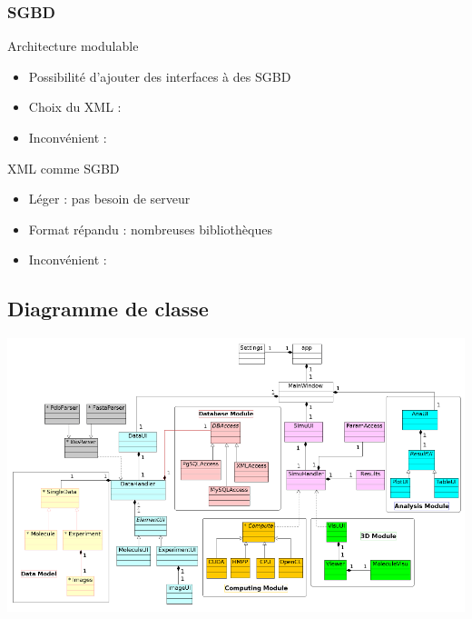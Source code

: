 \documentclass{beamer}
\begin{document}
\begin{frame}
  \frametitle{SGBD}

  \begin{block}{Architecture modulable}
    \begin{itemize}
    \item Possibilité d'ajouter des interfaces à des SGBD
    \item Choix du XML :
    \item Inconvénient : 
    \end{itemize}
  \end{block}

  \begin{block}{XML comme SGBD}
    \begin{itemize}
    \item Léger :  pas besoin de serveur
    \item Format répandu : nombreuses bibliothèques
    \item Inconvénient : 
    \end{itemize}
  \end{block}

\end{frame}

\subsection{Diagramme de classe}

\begin{frame}

  \begin{center}
      \includegraphics[width=1\columnwidth]{img/diag.png}
  \end{center}

\end{frame}
\end{document}
